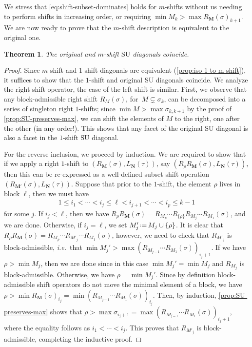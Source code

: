 \documentclass{amsart}
\newtheorem{theorem}{Theorem}[section]
\theoremstyle{definition}
\newcommand{\eqdef}{\mbox{\,\raisebox{0.2ex}{\scriptsize\ensuremath{\mathrm:}}\ensuremath{=}\,}} %
\newcommand{\ie}{\textit{i.e.}~} %
\newcommand{\SU}{\mathrm{SU}}
\begin{document}
We stress that \cref{eq:shift-subset-dominates} holds for $m$-shifts without us needing to perform shifts in increasing order, or requiring $\min M_k > \max R_{\mathbf{M}}(\sigma)_{k+1}$.
We are now ready to prove that the $m$-shift description is equivalent to the original one. 

\begin{theorem}
\label{prop:iso-original-shift-diagonals}
The original and $m$-shift $\SU$ diagonals coincide.
\end{theorem}

\begin{proof}
Since $m$-shift and $1$-shift diagonals are equivalent (\cref{prop:iso-1-to-m-shift}), it suffices to show that the $1$-shift and original $\SU$ diagonals coincide. 
We analyze the right shift operator, the case of the left shift is similar. 
First, we observe that any block-admissible right shift $R_{M}(\sigma)$, for~$M\subsetneq\sigma_k$, can be decomposed into a series of singleton right $1$-shifts; since $\min M > \max \sigma_{k,k+1}$ by the proof of \cref{prop:SU-preserves-max}, we can shift the elements of $M$ to the right, one after the other (in any order!).
This shows that any facet of the original $\SU$ diagonal is also a facet in the $1$-shift $\SU$ diagonal.

For the reverse inclusion, we proceed by induction. 
We are required to show that if we apply a right $1$-shift to $(R_{\mathbf{M}}(\sigma),L_{\mathbf{N}}(\tau))$, say $(R_{\rho}R_{\mathbf{M}}(\sigma),L_{\mathbf{N}}(\tau))$, then this can be re-expressed as a well-defined subset shift operation $(R_{\mathbf{M'}}(\sigma),L_{\mathbf{N}}(\tau))$. 
Suppose that prior to the $1$-shift, the element $\rho$ lives in block $\ell$, then we must have
\begin{align*}
1 \leq i_1 < \cdots < i_j \leq \ell < i_{j+1} <\cdots< i_p \leq k-1
\end{align*}
for some $j$. 
If $i_j < \ell$, then we have $R_{\rho}R_{\mathbf{M}}(\sigma) = R_{M_{p}}\cdots R_{\{\rho\}}R_{M_{j}}\cdots R_{M_{1}}(\sigma)$, and we are done.
Otherwise, if $i_j = \ell$, we set $M'_{j} \eqdef M_{j} \cup \{\rho \}$. 
It is clear that ${R_{\rho}R_{\mathbf{M}}(\sigma) = R_{M_{p}}\cdots R_{M'_{j}}\cdots R_{M_{1}}(\sigma)}$, however, we need to check that $R_{M'_{j}}$ is block-admissible, \ie that $\min M_{j}' > \max (R_{M_{j-1}}\cdots R_{M_{1}}(\sigma))_{i_j+1}$.
If we have~$\rho > \min M_{j}$, then we are done since in this case $\min M_{j}'=\min M_{j}$ and $R_{M_{j}}$ is block-admissible.
Otherwise, we have $\rho=\min M_{j}'$. 
Since by definition block-admissible shift operators do not move the minimal element of a block, we have $\rho > \min R_{\mathbf{M}}(\sigma)_{i_j}= \min (R_{M_{j-1}}\cdots R_{M_{1}}(\sigma))_{i_j}$.
Then, by induction, \cref{prop:SU-preserves-max} shows that $\rho>\max \sigma_{i_j+1} = \max (R_{M_{j-1}}\cdots R_{M_{1}}(\sigma))_{i_j + 1}$, where the equality follows as $i_1<\cdots<i_j$. 
This proves that $R_{M'_{j}}$ is block-admissible, completing the inductive proof.
\end{proof}
\end{document}
